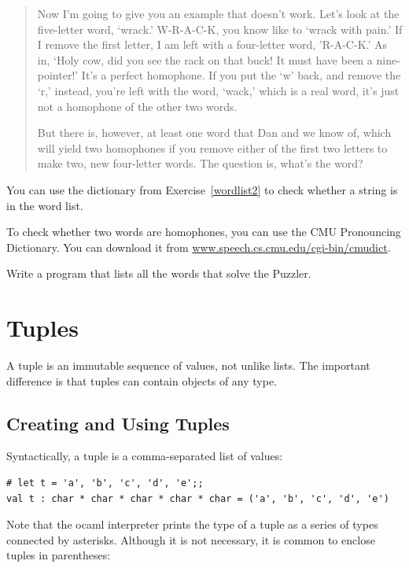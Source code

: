 \documentclass[10pt]{book}
\begin{document}
{\begin{ex}
\begin{quote}
Now I'm going to give you an example that doesn't work. Let's look at
the five-letter word, `wrack.' W-R-A-C-K, you know like to `wrack with
pain.' If I remove the first letter, I am left with a four-letter
word, 'R-A-C-K.' As in, `Holy cow, did you see the rack on that buck!
It must have been a nine-pointer!' It's a perfect homophone. If you
put the `w' back, and remove the `r,' instead, you're left with the
word, `wack,' which is a real word, it's just not a homophone of the
other two words.

But there is, however, at least one word that Dan and we know of,
which will yield two homophones if you remove either of the first two
letters to make two, new four-letter words. The question is, what's
the word?
\end{quote}


You can use the dictionary from Exercise~\ref{wordlist2} to check
whether a string is in the word list.

To check whether two words are homophones, you can use the CMU
Pronouncing Dictionary.  You can download it from
\url{www.speech.cs.cmu.edu/cgi-bin/cmudict}.

Write a program that lists all the words that solve the Puzzler.

\end{ex}



\chapter{Tuples}
\label{tuplechap}




A tuple is an immutable sequence of values, not unlike lists. The important difference is that tuples can contain objects of any type.

\section{Creating and Using Tuples}

Syntactically, a tuple is a comma-separated list of values:

\beforeverb
\begin{verbatim}
# let t = 'a', 'b', 'c', 'd', 'e';;
val t : char * char * char * char * char = ('a', 'b', 'c', 'd', 'e')
\end{verbatim}
\afterverb
%
Note that the ocaml interpreter prints the type of a tuple as a series of types connected by asterisks. Although it is not necessary, it is common to enclose tuples in
parentheses:

}
\end{document}
